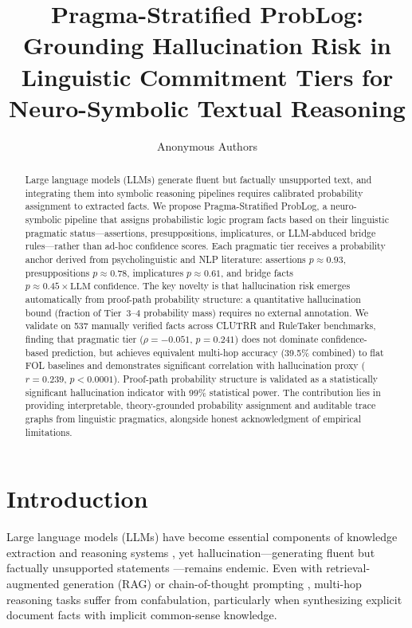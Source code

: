 \documentclass[11pt,letterpaper]{article}
\title{\textbf{Pragma-Stratified ProbLog: Grounding Hallucination Risk in Linguistic Commitment Tiers for Neuro-Symbolic Textual Reasoning}}
\author{
Anonymous Authors
}
\date{}
\begin{document}
\maketitle

\begin{abstract}
Large language models (LLMs) generate fluent but factually unsupported text, and integrating them into symbolic reasoning pipelines requires calibrated probability assignment to extracted facts. We propose Pragma-Stratified ProbLog, a neuro-symbolic pipeline that assigns probabilistic logic program facts based on their linguistic pragmatic status---assertions, presuppositions, implicatures, or LLM-abduced bridge rules---rather than ad-hoc confidence scores. Each pragmatic tier receives a probability anchor derived from psycholinguistic and NLP literature: assertions $p\approx0.93$, presuppositions $p\approx0.78$, implicatures $p\approx0.61$, and bridge facts $p\approx0.45 \times \text{LLM confidence}$. The key novelty is that hallucination risk emerges automatically from proof-path probability structure: a quantitative hallucination bound (fraction of Tier~3--4 probability mass) requires no external annotation. We validate on 537 manually verified facts across CLUTRR and RuleTaker benchmarks, finding that pragmatic tier ($\rho=-0.051$, $p=0.241$) does not dominate confidence-based prediction, but achieves equivalent multi-hop accuracy (39.5\% combined) to flat FOL baselines and demonstrates significant correlation with hallucination proxy ($r=0.239$, $p<0.0001$). Proof-path probability structure is validated as a statistically significant hallucination indicator with 99\% statistical power. The contribution lies in providing interpretable, theory-grounded probability assignment and auditable trace graphs from linguistic pragmatics, alongside honest acknowledgment of empirical limitations.
\end{abstract}

\section{Introduction}

Large language models (LLMs) have become essential components of knowledge extraction and reasoning systems \citep{Wei2022}, yet hallucination---generating fluent but factually unsupported statements \citep{Kubbra2024}---remains endemic. Even with retrieval-augmented generation (RAG) \citep{Lewis2020} or chain-of-thought prompting \citep{Wei2022}, multi-hop reasoning tasks suffer from confabulation, particularly when synthesizing explicit document facts with implicit common-sense knowledge.
\end{document}
